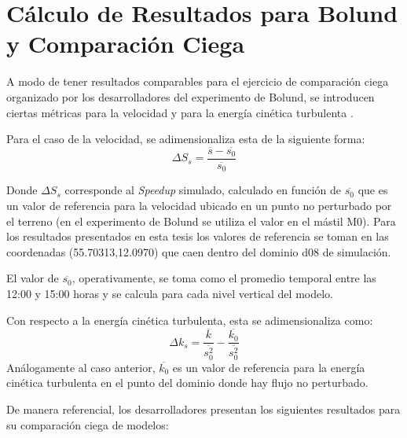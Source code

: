 \graphicspath{{./Imagenes/an1/}}
\chapter{Cálculo de Resultados para Bolund y Comparación Ciega}
A modo de tener resultados comparables para el ejercicio de comparación ciega organizado por los desarrolladores del experimento de Bolund, se introducen ciertas métricas para la velocidad y para la energía cinética turbulenta \cite{Bechmann2011}.

Para el caso de la velocidad, se adimensionaliza esta de la siguiente forma:
\begin{equation*}
\Delta S_s = \frac{\overline{s} - \overline{s_0}}{\overline{s_0}}
\end{equation*}

Donde $\Delta S_s$ corresponde al \emph{Speedup} simulado, calculado en función de $\overline{s_0}$ que es un valor de referencia para la velocidad ubicado en un punto no perturbado por el terreno (en el experimento de Bolund se utiliza el valor en el mástil M0). Para los resultados presentados en esta tesis los valores de referencia se toman en las coordenadas (55.70313,12.0970) que caen dentro del dominio d08 de simulación.

El valor de $\overline{s_0}$, operativamente, se toma como el promedio temporal entre las 12:00 y 15:00 horas y se calcula para cada nivel vertical del modelo.

Con respecto a la energía cinética turbulenta, esta se adimensionaliza como:
\begin{equation*}
\Delta k_s = \frac{\overline{k}}{\overline{s_0^2}} - \frac{\overline{k_0}}{\overline{s_0^2}}
\end{equation*}
Análogamente al caso anterior, $\overline{k_0}$ es un valor de referencia para la energía cinética turbulenta en el punto del dominio donde hay flujo no perturbado.

De manera referencial, los desarrolladores presentan los siguientes resultados para su comparación ciega de modelos:

